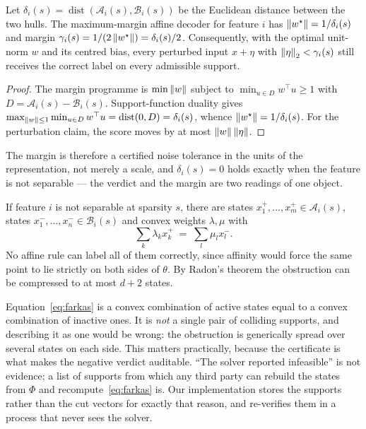 \begin{proposition}
\label{prop:margin}
Let $\delta_i(s)=\operatorname{dist}(\mathcal A_i(s),\mathcal B_i(s))$ be the Euclidean distance
between the two hulls. The maximum-margin affine decoder for feature $i$ has
$\left\lVert w^{\star} \right\rVert=1/\delta_i(s)$ and margin $\gamma_i(s)=1/(2\left\lVert w^{\star} \right\rVert)=\delta_i(s)/2$.
Consequently, with the optimal unit-norm $w$ and its centred bias, every perturbed input
$x+\eta$ with $\left\lVert \eta \right\rVert_2<\gamma_i(s)$ still receives the correct label on every admissible
support.
\end{proposition}

\begin{proof}
The margin programme is $\min\left\lVert w \right\rVert$ subject to $\min_{u\in D}w^{\top}u\ge1$ with
$D=\mathcal A_i(s)-\mathcal B_i(s)$. Support-function duality gives
$\max_{\left\lVert w \right\rVert\le1}\min_{u\in D}w^{\top}u=\operatorname{dist}(0,D)=\delta_i(s)$, whence
$\left\lVert w^{\star} \right\rVert=1/\delta_i(s)$. For the perturbation claim, the score moves by at most
$\left\lVert w \right\rVert\left\lVert \eta \right\rVert$.
\end{proof}

The margin is therefore a certified noise tolerance in the units of the representation, not
merely a scale, and $\delta_i(s)=0$ holds exactly when the feature is not separable --- the
verdict and the margin are two readings of one object.

\begin{proposition}
\label{prop:farkas}
If feature $i$ is not separable at sparsity $s$, there are states
$x^{+}_1,\dots,x^{+}_m\in\mathcal A_i(s)$, states $x^{-}_1,\dots,x^{-}_n\in\mathcal B_i(s)$ and
convex weights $\lambda,\mu$ with
\begin{equation}
  \sum_{k}\lambda_kx^{+}_k\;=\;\sum_{l}\mu_lx^{-}_l .
  \label{eq:farkas}
\end{equation}
No affine rule can label all of them correctly, since affinity would force the same point to lie
strictly on both sides of $\theta$. By Radon's theorem the obstruction can be compressed to at
most $d+2$ states.
\end{proposition}

\begin{remark}
\label{rem:cert}
Equation~\eqref{eq:farkas} is a convex combination of active states equal to a convex combination
of inactive ones. It is \emph{not} a single pair of colliding supports, and describing it as one
would be wrong: the obstruction is generically spread over several states on each side. This
matters practically, because the certificate is what makes the negative verdict auditable. ``The
solver reported infeasible'' is not evidence; a list of supports from which any third party can
rebuild the states from $\Phi$ and recompute~\eqref{eq:farkas} is. Our implementation stores the
supports rather than the cut vectors for exactly that reason, and re-verifies them in a process
that never sees the solver.
\end{remark}

